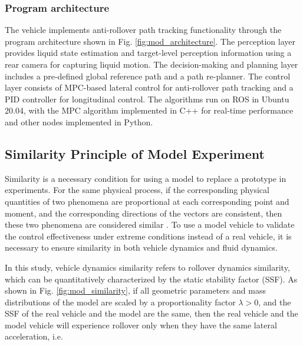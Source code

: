 \subsubsection{Program architecture}
The vehicle implements anti-rollover path tracking functionality through the program architecture shown in Fig. \ref{fig:mod_architecture}. The perception layer provides liquid state estimation and target-level perception information using a rear camera for capturing liquid motion. The decision-making and planning layer includes a pre-defined global reference path and a path re-planner. The control layer consists of MPC-based lateral control for anti-rollover path tracking and a PID controller for longitudinal control. The algorithms run on ROS in Ubuntu 20.04, with the MPC algorithm implemented in C++ for real-time performance and other nodes implemented in Python.


















\vspace{-0.5cm}
\subsection{Similarity Principle of Model Experiment}

Similarity is a necessary condition for using a model to replace a prototype in experiments. For the same physical process, if the corresponding physical quantities of two phenomena are proportional at each corresponding point and moment, and the corresponding directions of the vectors are consistent, then these two phenomena are considered similar \cite{BookFluidMechanics}. To use a model vehicle to validate the control effectiveness under extreme conditions instead of a real vehicle, it is necessary to ensure similarity in both vehicle dynamics and fluid dynamics.

In this study, vehicle dynamics similarity refers to rollover dynamics similarity, which can be quantitatively characterized by the static stability factor (SSF). As shown in Fig. \ref{fig:mod_similarity}, if all geometric parameters and mass distributions of the model are scaled by a proportionality factor $\lambda > 0$, and the SSF of the real vehicle and the model are the same, then the real vehicle and the model vehicle will experience rollover only when they have the same lateral acceleration, i.e.


